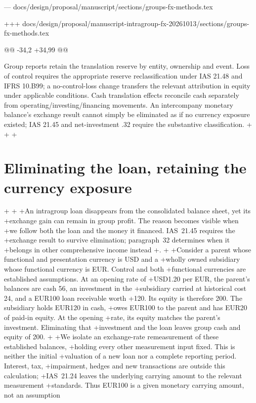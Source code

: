 --- docs/design/proposal/manuscript/sections/groups-fx-methods.tex

+++ docs/design/proposal/manuscript-intragroup-fx-20261013/sections/groups-fx-methods.tex

@@ -34,2 +34,99 @@

 
 Group reports retain the translation reserve by entity, ownership and event. Loss of control requires the appropriate reserve reclassification under IAS 21.48 and IFRS 10.B99; a no-control-loss change transfers the relevant attribution in equity under applicable conditions. Cash translation effects reconcile cash separately from operating/investing/financing movements. An intercompany monetary balance's exchange result cannot simply be eliminated as if no currency exposure existed; IAS 21.45 and net-investment .32 require the substantive classification.
+
+\clearpage
+\section{Eliminating the loan, retaining the currency exposure}
+\label{sec:intragroup-fx-example}
+
+An intragroup loan disappears from the consolidated balance sheet, yet its
+exchange gain can remain in group profit. The reason becomes visible when
+we follow both the loan and the money it financed. IAS~21.45 requires the
+exchange result to survive elimination; paragraph~32 determines when it
+belongs in other comprehensive income instead
+\citep[IAS~21.32--33, .45]{eu20231803}.
+
+Consider a parent whose functional and presentation currency is USD and a
+wholly owned subsidiary whose functional currency is EUR. Control and both
+functional currencies are established assumptions. At an opening rate of
+USD1.20 per EUR, the parent's balances are cash 56, an investment in the
+subsidiary carried at historical cost 24, and a EUR100 loan receivable worth
+120. Its equity is therefore 200. The subsidiary holds EUR120 in cash,
+owes EUR100 to the parent and has EUR20 of paid-in equity. At the opening
+rate, its equity matches the parent's investment. Eliminating that
+investment and the loan leaves group cash and equity of 200.
+
+We isolate an exchange-rate remeasurement of these established balances,
+holding every other measurement input fixed. This is neither the initial
+valuation of a new loan nor a complete reporting period. Interest, tax,
+impairment, hedges and new transactions are outside this calculation;
+IAS~21.24 leaves the underlying carrying amount to the relevant measurement
+standards. Thus EUR100 is a given monetary carrying amount, not an assumption
